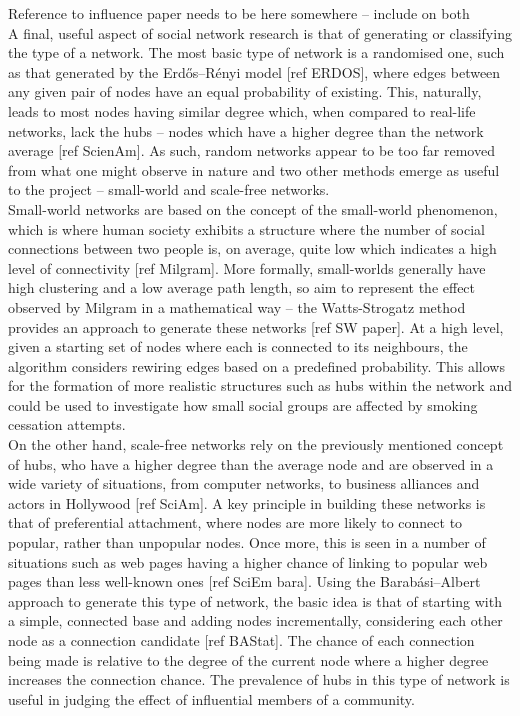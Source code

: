 \documentclass[]{report}
\begin{document}
Reference to influence paper needs to be here somewhere – include on both\\
A final, useful aspect of social network research is that of generating or classifying the type of a network. The most basic type of network is a randomised one, such as that generated by the Erdős–Rényi model [ref ERDOS], where edges between any given pair of nodes have an equal probability of existing. This, naturally, leads to most nodes having similar degree which, when compared to real-life networks, lack the hubs – nodes which have a higher degree than the network average [ref ScienAm]. As such, random networks appear to be too far removed from what one might observe in nature and two other methods emerge as useful to the project – small-world and scale-free networks. \\
Small-world networks are based on the concept of the small-world phenomenon, which is where human society exhibits a structure where the  number of social connections between two people is, on average, quite low which indicates a high level of connectivity [ref Milgram]. More formally, small-worlds generally have high clustering and a low average path length, so aim to represent the effect observed by Milgram in a mathematical way – the Watts-Strogatz method provides an approach to generate these networks [ref SW paper]. At a high level, given a starting set of nodes where each is connected to its neighbours, the algorithm considers rewiring edges based on a predefined probability. This allows for the formation of more realistic structures such as hubs within the network and could be used to investigate how small social groups are affected by smoking cessation attempts. \\
On the other hand, scale-free networks rely on the previously mentioned concept of hubs, who have a higher degree than the average node and are observed in a wide variety of situations, from computer networks, to business alliances and actors in Hollywood [ref SciAm]. A key principle in building these networks is that of preferential attachment, where nodes are more likely to connect to popular, rather than unpopular nodes. Once more, this is seen in a number of situations such as web pages having a higher chance of linking to popular web pages than less well-known ones [ref SciEm bara]. Using the Barabási–Albert approach to generate this type of network, the basic idea is that of starting with a simple, connected base and adding nodes incrementally, considering each other node as a connection candidate [ref BAStat]. The chance of each connection being made is relative to the degree of the current node where a higher degree increases the connection chance. The prevalence of hubs in this type of network is useful in judging the effect of influential members of a community.
\end{document}
